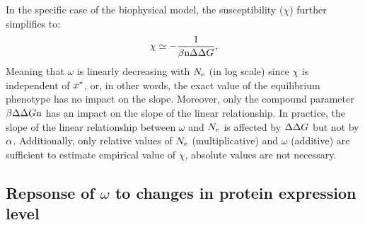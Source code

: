 In the specific case of the biophysical model, the susceptibility ($\chi$) further simplifies to:
\begin{gather}
    \chi \simeq -\dfrac{1}{\beta \Nsite \DeltaDeltaG}, \label{eq:chi_application}
\end{gather}
Meaning that $\omega$ is linearly decreasing with $N_{\mathrm{e}}$ (in log scale) since $\chi$ is independent of $x^{*}$, or, in other words, the exact value of the equilibrium phenotype has no impact on the slope.
Moreover, only the compound parameter $\beta \Delta \Delta G \text{n}$ has an impact on the slope of the linear relationship.
In practice, the slope of the linear relationship between $\omega$ and $N_{\mathrm{e}}$ is affected by $\Delta \Delta G$ but not by $\alpha$.
Additionally, only relative values of $N_{\mathrm{e}}$ (multiplicative) and $\omega$ (additive) are sufficient to estimate empirical value of $\chi$, absolute values are not necessary.

\subsection{Repsonse of \texorpdfstring{$\omega$}{ω} to changes in protein expression level}
\label{sec:expression}

